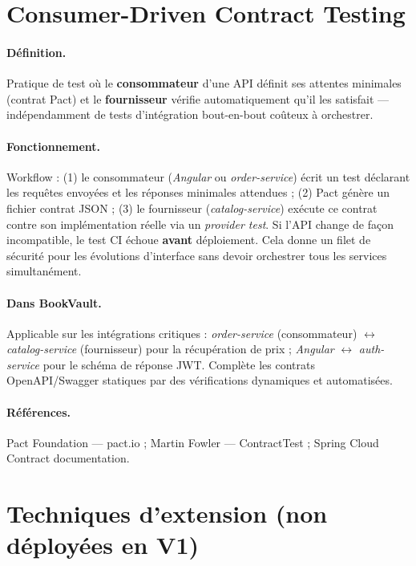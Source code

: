 \documentclass[12pt,a4paper]{report}
\begin{document}
\section{Consumer-Driven Contract Testing}

\paragraph{Définition.} Pratique de test où le \textbf{consommateur} d'une API définit ses attentes minimales (contrat Pact) et le \textbf{fournisseur} vérifie automatiquement qu'il les satisfait — indépendamment de tests d'intégration bout-en-bout coûteux à orchestrer.\par

\paragraph{Fonctionnement.} Workflow : (1) le consommateur (\textit{Angular} ou \textit{order-service}) écrit un test déclarant les requêtes envoyées et les réponses minimales attendues ; (2) Pact génère un fichier contrat JSON ; (3) le fournisseur (\textit{catalog-service}) exécute ce contrat contre son implémentation réelle via un \textit{provider test}. Si l'API change de façon incompatible, le test CI échoue \textbf{avant} déploiement. Cela donne un filet de sécurité pour les évolutions d'interface sans devoir orchestrer tous les services simultanément.\par

\paragraph{Dans BookVault.} Applicable sur les intégrations critiques : \textit{order-service} (consommateur) $\leftrightarrow$ \textit{catalog-service} (fournisseur) pour la récupération de prix ; \textit{Angular} $\leftrightarrow$ \textit{auth-service} pour le schéma de réponse JWT. Complète les contrats OpenAPI/Swagger statiques par des vérifications dynamiques et automatisées.\par

\paragraph{Références.} Pact Foundation — pact.io ; Martin Fowler — ContractTest ; Spring Cloud Contract documentation.\par


\section{Techniques d'extension (non déployées en V1)}
\end{document}
